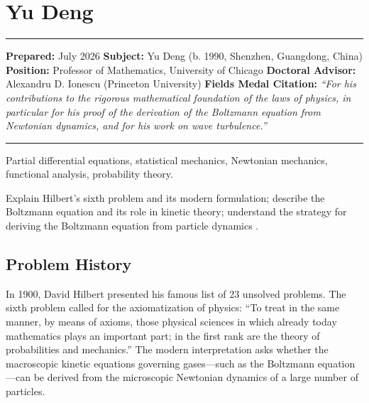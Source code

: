 \chapter{Yu Deng}\label{ch2026yudeng:yu-deng-fields-medal-2026}

\begin{center}\rule{0.5\linewidth}{0.5pt}\end{center}

\textbf{Prepared:} July 2026 \textbf{Subject:} Yu Deng (b. 1990, Shenzhen, Guangdong, China) \textbf{Position:} Professor of Mathematics, University of Chicago \textbf{Doctoral Advisor:} Alexandru D. Ionescu (Princeton University) \textbf{Fields Medal Citation:} \emph{``For his contributions to the rigorous mathematical foundation of the laws of physics, in particular for his proof of the derivation of the Boltzmann equation from Newtonian dynamics, and for his work on wave turbulence.''}

\begin{center}\rule{0.5\linewidth}{0.5pt}\end{center}

\begin{prereqs} Partial differential equations, statistical mechanics, Newtonian mechanics, functional analysis, probability theory. \end{prereqs}

\begin{objectives} Explain Hilbert's sixth problem and its modern formulation; describe the Boltzmann equation and its role in kinetic theory; understand the strategy for deriving the Boltzmann equation from particle dynamics \cite{denghanima2024}. \end{objectives}

\section{Problem History}

In 1900, David Hilbert presented his famous list of 23 unsolved problems. The sixth problem called for the axiomatization of physics: ``To treat in the same manner, by means of axioms, those physical sciences in which already today mathematics plays an important part; in the first rank are the theory of probabilities and mechanics.'' The modern interpretation asks whether the macroscopic kinetic equations governing gases---such as the Boltzmann equation---can be derived from the microscopic Newtonian dynamics of a large number of particles.

